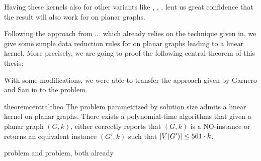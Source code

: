 Having these kernels also for other variants like \eddom, \efdom, \cdom, \rbdom lent us great confidence that the result will also work for \sdom on planar graphs.


Following the approach from ... which already relies on the technique given in, we give some simple data reduction rules for \sdom on planar graphs leading to a linear kernel. More precisely, we are going to proof the following central theorem of this thesis:

With some modifications, we were able to transfer the approach given by Garnero and Sau in \cite{Garnero2018} to the \sdom problem.

\begin{restatable}[]{theorem}{centraltheo}\label{thm:central}
    The \sdom problem parametrized by solution size admits a linear kernel on planar graphs. There exists a polynomial-time algorithms that given a planar graph $(G, k)$, either correctly reports that $(G, k)$ is a NO-instance or returns an equivalent instance $(G', k)$ such that $\abs{V(G')} \leq 561 \cdot k$.
\end{restatable}

\dom problem and \tdom problem, both already 

